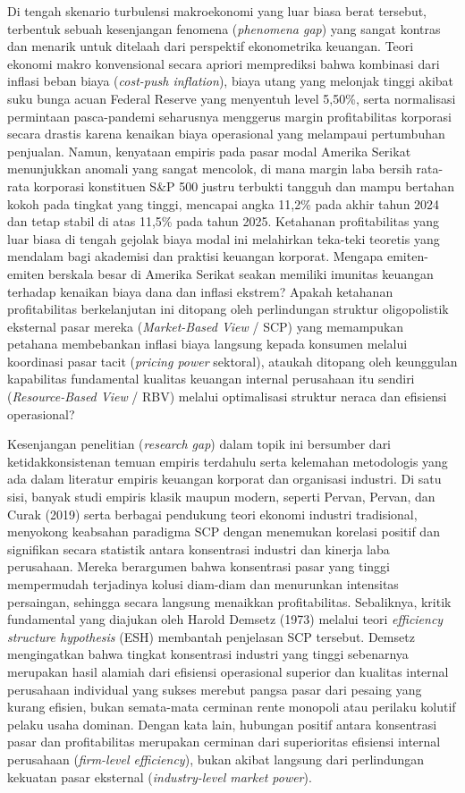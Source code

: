 \documentclass[12pt,a4paper]{article}
\begin{document}
Di tengah skenario turbulensi makroekonomi yang luar biasa berat
tersebut, terbentuk sebuah kesenjangan fenomena (\emph{phenomena gap})
yang sangat kontras dan menarik untuk ditelaah dari perspektif
ekonometrika keuangan. Teori ekonomi makro konvensional secara apriori
memprediksi bahwa kombinasi dari inflasi beban biaya (\emph{cost-push
inflation}), biaya utang yang melonjak tinggi akibat suku bunga acuan
Federal Reserve yang menyentuh level 5,50\%, serta normalisasi
permintaan pasca-pandemi seharusnya menggerus margin profitabilitas
korporasi secara drastis karena kenaikan biaya operasional yang
melampaui pertumbuhan penjualan. Namun, kenyataan empiris pada pasar
modal Amerika Serikat menunjukkan anomali yang sangat mencolok, di mana
margin laba bersih rata-rata korporasi konstituen S\&P 500 justru
terbukti tangguh dan mampu bertahan kokoh pada tingkat yang tinggi,
mencapai angka 11,2\% pada akhir tahun 2024 dan tetap stabil di atas
11,5\% pada tahun 2025. Ketahanan profitabilitas yang luar biasa di
tengah gejolak biaya modal ini melahirkan teka-teki teoretis yang
mendalam bagi akademisi dan praktisi keuangan korporat. Mengapa
emiten-emiten berskala besar di Amerika Serikat seakan memiliki imunitas
keuangan terhadap kenaikan biaya dana dan inflasi ekstrem? Apakah
ketahanan profitabilitas berkelanjutan ini ditopang oleh perlindungan
struktur oligopolistik eksternal pasar mereka (\emph{Market-Based View}
/ SCP) yang memampukan petahana membebankan inflasi biaya langsung
kepada konsumen melalui koordinasi pasar tacit (\emph{pricing power}
sektoral), ataukah ditopang oleh keunggulan kapabilitas fundamental
kualitas keuangan internal perusahaan itu sendiri (\emph{Resource-Based
View} / RBV) melalui optimalisasi struktur neraca dan efisiensi
operasional?

Kesenjangan penelitian (\emph{research gap}) dalam topik ini bersumber
dari ketidakkonsistenan temuan empiris terdahulu serta kelemahan
metodologis yang ada dalam literatur empiris keuangan korporat dan
organisasi industri. Di satu sisi, banyak studi empiris klasik maupun
modern, seperti Pervan, Pervan, dan Curak (2019) serta berbagai
pendukung teori ekonomi industri tradisional, menyokong keabsahan
paradigma SCP dengan menemukan korelasi positif dan signifikan secara
statistik antara konsentrasi industri dan kinerja laba perusahaan.
Mereka berargumen bahwa konsentrasi pasar yang tinggi mempermudah
terjadinya kolusi diam-diam dan menurunkan intensitas persaingan,
sehingga secara langsung menaikkan profitabilitas. Sebaliknya, kritik
fundamental yang diajukan oleh Harold Demsetz (1973) melalui teori
\emph{efficiency structure hypothesis} (ESH) membantah penjelasan SCP
tersebut. Demsetz mengingatkan bahwa tingkat konsentrasi industri yang
tinggi sebenarnya merupakan hasil alamiah dari efisiensi operasional
superior dan kualitas internal perusahaan individual yang sukses merebut
pangsa pasar dari pesaing yang kurang efisien, bukan semata-mata
cerminan rente monopoli atau perilaku kolutif pelaku usaha dominan.
Dengan kata lain, hubungan positif antara konsentrasi pasar dan
profitabilitas merupakan cerminan dari superioritas efisiensi internal
perusahaan (\emph{firm-level efficiency}), bukan akibat langsung dari
perlindungan kekuatan pasar eksternal (\emph{industry-level market
power}).
\end{document}
